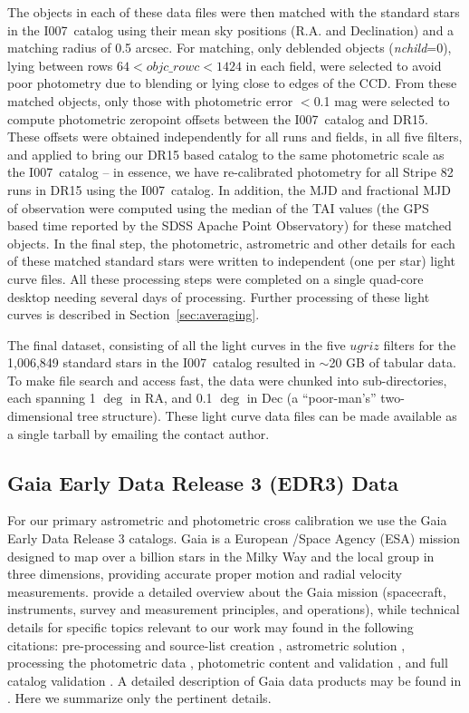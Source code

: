 \documentclass[fleqn,usenatbib]{mnras}
\newcommand{\pO}{\hbox{I007}}
\begin{document}
The objects in each of these data files were then matched with the standard stars in the \pO\ catalog using their mean sky positions (R.A. and Declination) and a matching radius of 0.5 arcsec. For matching, only deblended objects ({\it nchild}=0), lying between rows $64 < objc\_rowc < 1424$ in each field, were selected to avoid poor photometry due to blending or lying close to edges of the CCD. From these matched objects, only those with photometric error $<$0.1 mag were selected to compute photometric zeropoint offsets between the \pO\ catalog and DR15. These offsets were obtained independently for all runs and fields, in all five filters, and applied to bring our DR15 based catalog to the same photometric scale as the \pO\ catalog -- in essence, we have re-calibrated photometry for all Stripe 82 runs in DR15 using the \pO\ catalog. In addition, the MJD and fractional MJD of observation were computed using the median of the TAI values (the GPS based time reported by the SDSS Apache Point Observatory) for these matched objects. In the final step, the photometric, astrometric and other details for each of these matched standard stars were written to independent (one per star) light curve files. All these processing steps were completed on a single quad-core desktop needing several days of processing. Further processing of these light curves is described in Section~\ref{sec:averaging}. 

The final dataset, consisting of all the light curves in the five $ugriz$ filters for the 1,006,849 standard stars in the \pO\ catalog resulted in $\sim$20 GB of tabular data. To make file search and access fast, the data were chunked into sub-directories, each spanning 1 $\deg$ in RA, and 0.1 $\deg$ in Dec (a ``poor-man's'' two-dimensional tree structure). These light curve data files can be made available as a single tarball by emailing the contact author. 

\subsection{Gaia Early Data Release 3 (EDR3) Data} \label{ssec:gaia}
 
For our primary astrometric and photometric cross calibration we use the Gaia Early Data Release 3 catalogs.  Gaia is a European /Space Agency (ESA) mission designed to map over a billion stars in the Milky Way and the local group in three dimensions, providing accurate proper motion and radial velocity measurements. \citet{GaiaCollab2016} provide a detailed overview about the Gaia mission (spacecraft, instruments, survey and measurement principles, and operations), while technical details for specific topics relevant to our work may found in the following citations: pre-processing and source-list creation \citep{Fabr2016}, astrometric solution \citep{LInd2018}, processing the photometric data \citep{Riel2018}, photometric content and validation \citep{Evan2018}, and full catalog validation \citep{Aren2018}. A detailed description of Gaia data products  
may be found in \citet{GaiaCollab2018b}. Here we summarize only the pertinent details.
\end{document}
